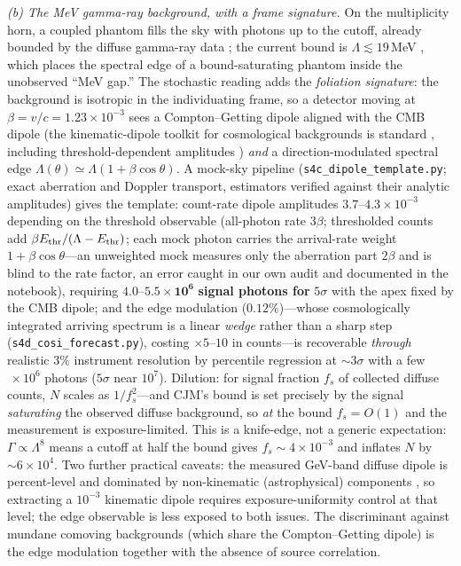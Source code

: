 \documentclass[11pt]{article}
\theoremstyle{definition}
\theoremstyle{remark}
\begin{document}
\emph{(b) The MeV gamma-ray background, with a frame signature.} On
the multiplicity horn, a coupled phantom fills the sky with photons
up to the cutoff, already bounded by the diffuse gamma-ray data
\cite{CJM2004,GV2013,ClinePhantom2024}; the current bound is
$\Lambda\lesssim19\,$MeV \cite{ClinePhantom2024}, which places the
spectral edge of a bound-saturating phantom inside the unobserved
``MeV gap.'' The stochastic reading adds
the \emph{foliation signature}: the background is isotropic in the
individuating frame, so a detector moving at
$\beta=v/c=1.23\times10^{-3}$ sees a Compton--Getting dipole
\cite{CG1935} aligned with the CMB dipole (the kinematic-dipole
toolkit for cosmological backgrounds is standard
\cite{KachelriessSerpico}, including threshold-dependent amplitudes
\cite{KinDipole2026}) \emph{and} a
direction-modulated spectral edge
$\Lambda(\theta)\simeq\Lambda(1+\beta\cos\theta)$. A mock-sky
pipeline (\texttt{s4c\_dipole\_template.py}; exact aberration and
Doppler transport, estimators verified against their analytic
amplitudes) gives the template: count-rate dipole amplitudes
$3.7$--$4.3\times10^{-3}$ depending on the threshold observable
(all-photon rate $3\beta$; thresholded counts add
$\beta E_{\rm thr}/(\Lambda-E_{\rm thr})$; each mock photon carries
the arrival-rate weight $1+\beta\cos\theta$---an unweighted mock
measures only the aberration part $2\beta$ and is blind to the rate
factor, an error caught in our own audit and documented in the
notebook), requiring
$\mathbf{4.0}$--$\mathbf{5.5\times10^{6}}$ \textbf{signal
photons for }$5\sigma$ with the apex fixed by the CMB dipole; and
the edge modulation ($0.12\%$)---whose cosmologically integrated
arriving spectrum is a linear \emph{wedge} rather than a sharp step
(\texttt{s4d\_cosi\_forecast.py}), costing ${\times}5$--$10$ in
counts---is recoverable \emph{through}
realistic $3\%$ instrument resolution by percentile regression at
$\sim3\sigma$ with a few$\,\times10^{6}$ photons ($5\sigma$ near
$10^{7}$). Dilution: for
signal fraction $f_s$ of collected diffuse counts, $N$ scales as
$1/f_s^{2}$---and CJM's bound is set precisely by the signal
\emph{saturating} the observed diffuse background, so \emph{at} the
bound $f_s=O(1)$ and the measurement is exposure-limited. This is a
knife-edge, not a generic expectation: $\Gamma\propto\Lambda^{8}$
means a cutoff at half the bound gives $f_s\sim4\times10^{-3}$ and
inflates $N$ by $\sim6\times10^{4}$. Two further practical caveats:
the measured GeV-band diffuse dipole is percent-level and dominated
by non-kinematic (astrophysical) components
\cite{DGBdipole}, so extracting a $10^{-3}$ kinematic dipole
requires exposure-uniformity control at that level; the edge
observable is less exposed to both issues. The discriminant against mundane comoving
backgrounds (which share the Compton--Getting dipole) is the edge
modulation together with the absence of source correlation.
\end{document}
